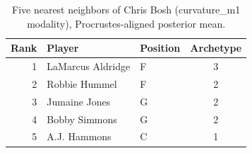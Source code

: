 \begin{table}[htbp]
  \centering\small
  \begin{tabular}{rllc}
    \toprule
    Rank & Player & Position & Archetype \\
    \midrule
    1 & LaMarcus Aldridge & F & 3 \\
    2 & Robbie Hummel & F & 2 \\
    3 & Jumaine Jones & G & 2 \\
    4 & Bobby Simmons & G & 2 \\
    5 & A.J. Hammons & C & 1 \\
    \bottomrule
  \end{tabular}
  \caption{Five nearest neighbors of Chris Bosh (curvature_m1 modality), Procrustes-aligned posterior mean.}
  \label{tab:Chris_Bosh_neighbors_curvature_m1}
\end{table}

